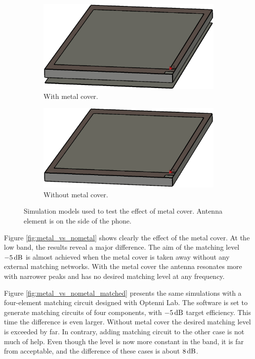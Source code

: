 \begin{figure}[H]
    \centering
    \begin{subfigure}[b]{0.49\textwidth}
    \includegraphics[width=\textwidth]{img/metal_cover.eps}
    \caption{With metal cover.}
    \label{fig:metal_cover}
    \end{subfigure}
    \begin{subfigure}[b]{0.49\textwidth}
    \includegraphics[width=\textwidth]{img/no_metal_cover.eps}
    \caption{Without metal cover.}
    \label{fig:nometal_cover}
    \end{subfigure}
    \caption{Simulation models used to test the effect of metal cover. Antenna element is on the side of the phone.}
    \label{fig:metal_vs_nometal_model}
\end{figure}

Figure \ref{fig:metal_vs_nometal} shows clearly the effect of the metal cover. At the low band, the results reveal a major difference. The aim of the matching level $-5\,\mathrm{dB}$ is almost achieved when the metal cover is taken away without any external matching networks. With the metal cover the antenna resonates more with narrower peaks and has no desired matching level at any frequency. 

Figure \ref{fig:metal_vs_nometal_matched} presents the same simulations with a four-element matching circuit designed with Optenni Lab. The software is set to generate matching circuits of four components, with $-5\,\mathrm{dB}$ target efficiency. This time the difference is even larger. Without metal cover the desired matching level is exceeded by far. In contrary, adding matching circuit to the other case is not much of help. Even though the level is now more constant in the band, it is far from acceptable, and the difference of these cases is about $8\,\mathrm{dB}$.

